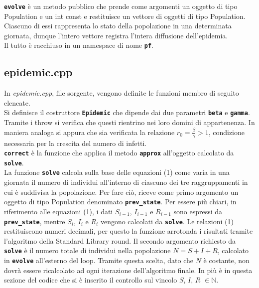 \documentclass[11pt, a4paper, left=3.5cm, right=3.5cm]{article}
\begin{document}
\textbf{\texttt{evolve}} \`{e} un metodo pubblico che prende come argomenti un oggetto di tipo Population e un int const e restituisce un vettore di oggetti di tipo Population. Ciascuno di essi rappresenta lo stato della popolazione in una determinata giornata, dunque l'intero vettore registra l'intera diffusione dell'epidemia.\\

Il tutto \`{e} racchiuso in un namespace di nome \textbf{\texttt{pf}}.

\subsection{epidemic.cpp}
In \textit{epidemic.cpp}, file sorgente, vengono definite le funzioni membro di seguito elencate.\\

 Si definisce il costruttore \textbf{\texttt{Epidemic}} che dipende dai due parametri \textbf{\texttt{beta}} e \textbf{\texttt{gamma}}. Tramite i throw si verifica che questi rientrino nei loro domini di appartenenza. In maniera analoga si appura che sia verificata la relazione $r_0=\frac{\beta}{\gamma}>1$, condizione necessaria per la crescita del numero di infetti. \\

\textbf{\texttt{correct}} \`{e} la funzione che applica il metodo \textbf{\texttt{approx}} all'oggetto calcolato da \textbf{\texttt{solve}}. \\

 La funzione \textbf{\texttt{solve}} calcola sulla base delle equazioni (1) come varia in una giornata il numero di individui all'interno di ciascuno dei tre raggruppamenti in cui \`{e} suddivisa la popolazione. Per fare ci\`{o}, riceve come primo argomento un oggetto di tipo Population denominato \textbf{\texttt{prev\_state}}. Per essere pi\`{u} chiari, in riferimento alle equazioni (1), i dati $S_{i-1}$, $I_{i-1}$ e $R_{i-1}$ sono espressi da \textbf{\texttt{prev\_state}}, mentre $S_i$, $I_i$ e $R_i$ vengono calcolati da \textbf{\texttt{solve}}. Le relazioni (1) restituiscono numeri decimali, per questo la funzione arrotonda i risultati tramite l'algoritmo della Standard Library round. Il secondo argomento richiesto da \textbf{\texttt{solve}} \`{e} il numero totale di individui nella popolazione $N=S+I+R$, calcolato in \textbf{\texttt{evolve}} all'esterno del loop. Tramite questa scelta, dato che $N$ \`{e} costante, non dovr\`{a} essere ricalcolato ad ogni iterazione dell'algoritmo finale. In pi\`{u} \`{e} in questa sezione del codice che si \`{e} inserito il controllo sul vincolo $S$, $I$, $R$ $\in \mathbb{N} $.
 \\
\end{document}
